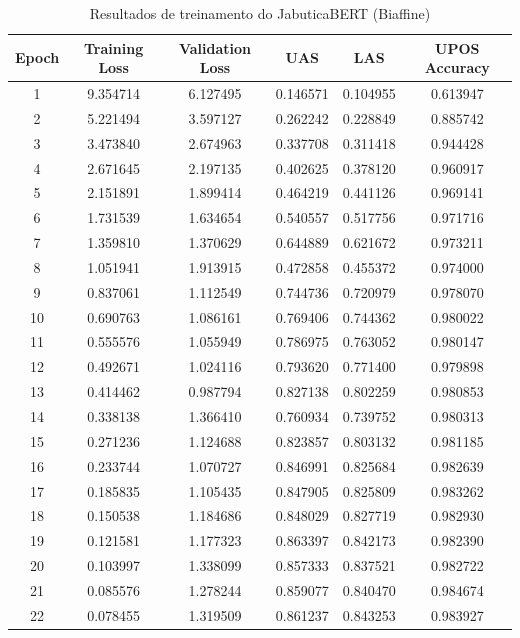 \begin{table}[ht]
\centering
\caption{Resultados de treinamento do JabuticaBERT (Biaffine)}
\label{tab:bertimbau-large-biaffine}
\begin{tabular}{c c c c c c}
\hline
\textbf{Epoch} & \textbf{Training Loss} & \textbf{Validation Loss} & \textbf{UAS} & \textbf{LAS} & \textbf{UPOS Accuracy} \\
\hline
1 & 9.354714 & 6.127495 & 0.146571 & 0.104955 & 0.613947 \\
2 & 5.221494 & 3.597127 & 0.262242 & 0.228849 & 0.885742 \\
3 & 3.473840 & 2.674963 & 0.337708 & 0.311418 & 0.944428 \\ 
4 & 2.671645 & 2.197135 & 0.402625 & 0.378120 & 0.960917 \\
5 & 2.151891 & 1.899414 & 0.464219 & 0.441126 & 0.969141 \\
6 & 1.731539 & 1.634654 & 0.540557 & 0.517756 & 0.971716 \\
7 & 1.359810 & 1.370629 & 0.644889 & 0.621672 & 0.973211 \\
8 & 1.051941 & 1.913915 & 0.472858 & 0.455372 & 0.974000 \\
9 & 0.837061 & 1.112549 & 0.744736 & 0.720979 & 0.978070 \\
10 & 0.690763 & 1.086161 & 0.769406 & 0.744362 & 0.980022 \\
11 & 0.555576 & 1.055949 & 0.786975 & 0.763052 & 0.980147 \\
12 & 0.492671 & 1.024116 & 0.793620 & 0.771400 & 0.979898 \\
13 & 0.414462 & 0.987794 & 0.827138 & 0.802259 & 0.980853 \\
14 & 0.338138 & 1.366410 & 0.760934 & 0.739752 & 0.980313 \\
15 & 0.271236 & 1.124688 & 0.823857 & 0.803132 & 0.981185 \\
16 & 0.233744 & 1.070727 & 0.846991 & 0.825684 & 0.982639 \\
17 & 0.185835 & 1.105435 & 0.847905 & 0.825809 & 0.983262 \\
18 & 0.150538 & 1.184686 & 0.848029 & 0.827719 & 0.982930 \\
19 & 0.121581 & 1.177323 & 0.863397 & 0.842173 & 0.982390 \\
20 & 0.103997 & 1.338099 & 0.857333 & 0.837521 & 0.982722 \\
21 & 0.085576 & 1.278244 & 0.859077 & 0.840470 & 0.984674 \\
22 & 0.078455 & 1.319509 & 0.861237 & 0.843253 & 0.983927 \\

\end{tabular}
\end{table}
